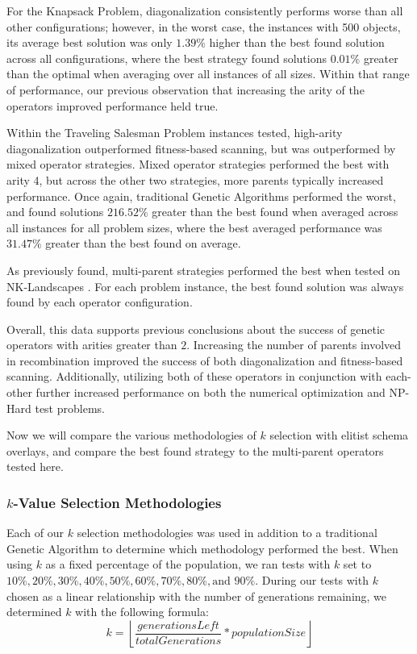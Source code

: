 %
%

For the Knapsack Problem, diagonalization consistently performs worse than all other configurations; however, in the worst case, the instances with 500 objects, its average best solution was only $1.39\%$ higher than the best found solution across all configurations, where the best strategy found solutions $0.01\%$ greater than the optimal when averaging over all instances of all sizes. Within that range of performance, our previous observation that increasing the arity of the operators improved performance held true.

%
%

Within the Traveling Salesman Problem instances tested, high-arity diagonalization outperformed fitness-based scanning, but was outperformed by mixed operator strategies. Mixed operator strategies performed the best with arity 4, but across the other two strategies, more parents typically increased performance. Once again, traditional Genetic Algorithms performed the worst, and found solutions $216.52\%$ greater than the best found when averaged across all instances for all problem sizes, where the best averaged performance was $31.47\%$ greater than the best found on average.

As previously found, multi-parent strategies performed the best when tested on NK-Landscapes \cite{Eiben96}. For each problem instance, the best found solution was always found by each operator configuration.

Overall, this data supports previous conclusions about the success of genetic operators with arities greater than $2$. Increasing the number of parents involved in recombination improved the success of both diagonalization and fitness-based scanning. Additionally, utilizing both of these operators in conjunction with each-other further increased performance on both the numerical optimization and NP-Hard test problems. 

Now we will compare the various methodologies of $k$ selection with elitist schema overlays, and compare the best found strategy to the multi-parent operators tested here. 

\subsubsection*{$k$-Value Selection Methodologies}
Each of our $k$ selection methodologies was used in addition to a traditional Genetic Algorithm to determine which methodology performed the best. When using $k$ as a fixed percentage of the population, we ran tests with $k$ set to $10\%, 20\%, 30\%, 40\%, 50\%, 60\%, 70\%, 80\%,\text{and } 90\%$. During our tests with $k$ chosen as a linear relationship with the number of generations remaining, we determined $k$ with the following formula:
\[
k = \left\lfloor \frac{generationsLeft}{totalGenerations} * populationSize \right\rfloor
\]

